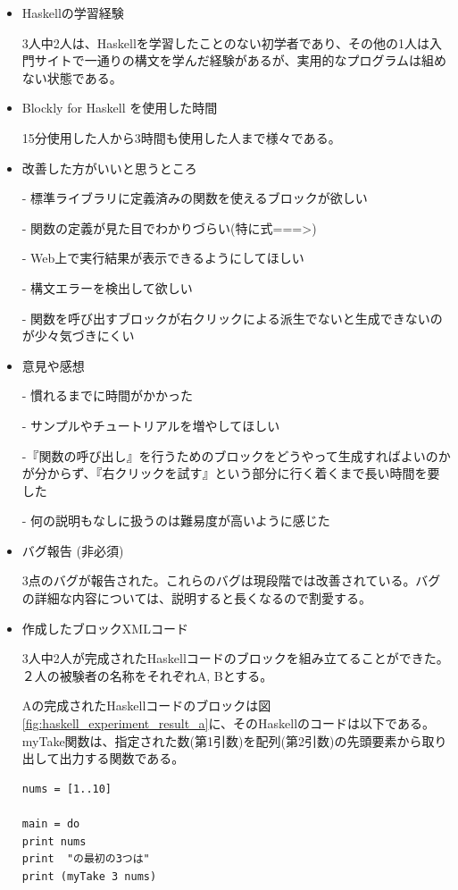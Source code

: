 \documentclass{risepaper}
\begin{document}
\begin{itemize}
\item Haskellの学習経験

3人中2人は、Haskellを学習したことのない初学者であり、その他の1人は入門サイトで一通りの構文を学んだ経験があるが、実用的なプログラムは組めない状態である。

\item Blockly for Haskell を使用した時間

15分使用した人から3時間も使用した人まで様々である。

\item 改善した方がいいと思うところ

- 標準ライブラリに定義済みの関数を使えるブロックが欲しい

- 関数の定義が見た目でわかりづらい(特に式===\textgreater)

- Web上で実行結果が表示できるようにしてほしい

- 構文エラーを検出して欲しい

- 関数を呼び出すブロックが右クリックによる派生でないと生成できないのが少々気づきにくい

\item 意見や感想

- 慣れるまでに時間がかかった

- サンプルやチュートリアルを増やしてほしい

-『関数の呼び出し』を行うためのブロックをどうやって生成すればよいのかが分からず、『右クリックを試す』という部分に行く着くまで長い時間を要した

- 何の説明もなしに扱うのは難易度が高いように感じた

\item バグ報告 (非必須)

3点のバグが報告された。これらのバグは現段階では改善されている。バグの詳細な内容については、説明すると長くなるので割愛する。
\item 作成したブロックXMLコード

3人中2人が完成されたHaskellコードのブロックを組み立てることができた。２人の被験者の名称をそれぞれA, Bとする。

Aの完成されたHaskellコードのブロックは図\ref{fig:haskell_experiment_result_a}に、そのHaskellのコードは以下である。myTake関数は、指定された数(第1引数)を配列(第2引数)の先頭要素から取り出して出力する関数である。
\begin{lstlisting}[basicstyle=\ttfamily\footnotesize]
nums = [1..10]

main = do
print nums
print  "の最初の3つは"
print (myTake 3 nums)


\end{lstlisting}
\end{itemize}
\end{document}

